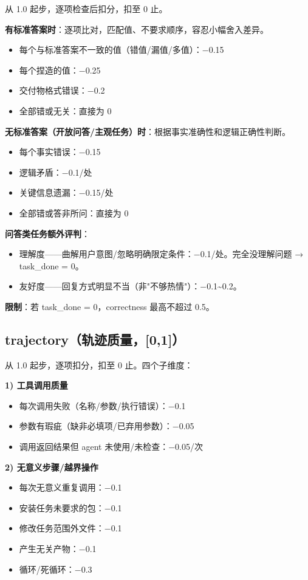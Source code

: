 从 1.0 起步，逐项检查后扣分，扣至 0 止。

\textbf{有标准答案时}：逐项比对，匹配值、不要求顺序，容忍小幅舍入差异。
\begin{itemize}
  \item 每个与标准答案不一致的值（错值/漏值/多值）：−0.15
  \item 每个捏造的值：−0.25
  \item 交付物格式错误：−0.2
  \item 全部错或无关：直接为 0
\end{itemize}

\textbf{无标准答案（开放问答/主观任务）时}：根据事实准确性和逻辑正确性判断。
\begin{itemize}
  \item 每个事实错误：−0.15
  \item 逻辑矛盾：−0.1/处
  \item 关键信息遗漏：−0.15/处
  \item 全部错或答非所问：直接为 0
\end{itemize}

\textbf{问答类任务额外评判}：
\begin{itemize}
  \item 理解度——曲解用户意图/忽略明确限定条件：−0.1/处。完全没理解问题 → task\_done = 0。
  \item 友好度——回复方式明显不当（非"不够热情"）：−0.1\textasciitilde0.2。
\end{itemize}

\textbf{限制}：若 task\_done = 0，correctness 最高不超过 0.5。

\subsection*{trajectory（轨迹质量，[0,1]）}

从 1.0 起步，逐项扣分，扣至 0 止。四个子维度：

\textbf{1) 工具调用质量}
\begin{itemize}
  \item 每次调用失败（名称/参数/执行错误）：−0.1
  \item 参数有瑕疵（缺非必填项/已弃用参数）：−0.05
  \item 调用返回结果但 agent 未使用/未检查：−0.05/次
\end{itemize}

\textbf{2) 无意义步骤/越界操作}
\begin{itemize}
  \item 每次无意义重复调用：−0.1
  \item 安装任务未要求的包：−0.1
  \item 修改任务范围外文件：−0.1
  \item 产生无关产物：−0.1
  \item 循环/死循环：−0.3
\end{itemize}

